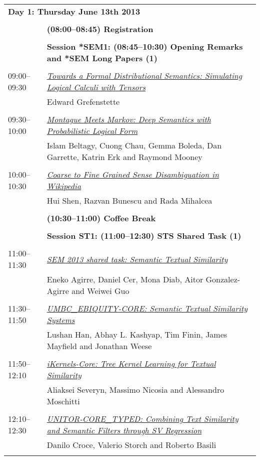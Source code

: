 \begin{tabular}{p{20mm}p{128mm}}
\multicolumn{2}{l}{\bf Day 1: Thursday June 13th 2013} \\
\\
 & {\bf (08:00--08:45) Registration} \\
\\
 & {\bf Session *SEM1: (08:45--10:30) Opening Remarks and *SEM Long Papers (1)} \\
\\
09:00--09:30 & \hyperlink{page.1}{\em Towards a Formal Distributional Semantics: Simulating Logical Calculi with Tensors}\\
         & Edward Grefenstette \\
\\

09:30--10:00 & \hyperlink{page.11}{\em Montague Meets Markov: Deep Semantics with Probabilistic Logical Form}\\
         & Islam Beltagy, Cuong Chau, Gemma Boleda, Dan Garrette, Katrin Erk and Raymond Mooney \\
\\

10:00--10:30 & \hyperlink{page.22}{\em Coarse to Fine Grained Sense Disambiguation in Wikipedia}\\
         & Hui Shen, Razvan Bunescu and Rada Mihalcea \\
\\

 & {\bf (10:30--11:00) Coffee Break} \\
\\
 & {\bf Session ST1: (11:00--12:30) STS Shared Task (1)} \\
\\
11:00--11:30 & \hyperlink{page.32}{\em *SEM 2013 shared task: Semantic Textual Similarity}\\
         & Eneko Agirre, Daniel Cer, Mona Diab, Aitor Gonzalez-Agirre and Weiwei Guo \\
\\

11:30--11:50 & \hyperlink{page.44}{\em UMBC\_EBIQUITY-CORE: Semantic Textual Similarity Systems}\\
         & Lushan Han, Abhay L. Kashyap, Tim Finin, James Mayfield and Jonathan Weese \\
\\

11:50--12:10 & \hyperlink{page.53}{\em iKernels-Core: Tree Kernel Learning for Textual Similarity}\\
         & Aliaksei Severyn, Massimo Nicosia and Alessandro Moschitti \\
\\

12:10--12:30 & \hyperlink{page.59}{\em UNITOR-CORE\_TYPED: Combining Text Similarity and Semantic Filters through SV Regression}\\
         & Danilo Croce, Valerio Storch and Roberto Basili \\
\\

\end{tabular}
